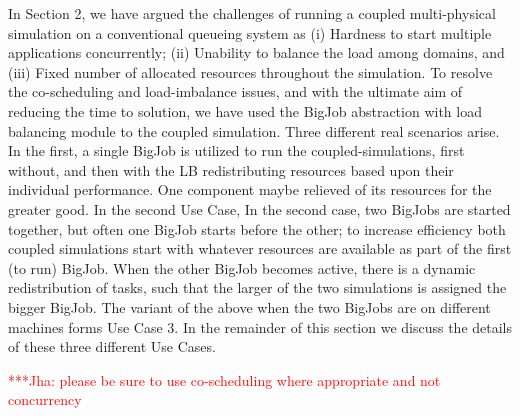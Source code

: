 \documentclass[conference,final]{IEEEtran}
\newcommand{\jhanote}[1]{ {\textcolor{red} { ***Jha: #1 }}}
\newcommand{\jhanote}[1]{}
\begin{document}
In Section 2, we have argued the challenges of running a coupled multi-physical simulation on a conventional queueing system as (i) Hardness to start multiple applications concurrently; (ii) Unability to balance the load among domains, and (iii) Fixed number of allocated resources throughout the simulation.  To resolve the co-scheduling and load-imbalance issues, and with the ultimate aim of reducing the time to solution, we have used the BigJob abstraction with load balancing module to the coupled simulation. %
Three different real scenarios arise. In the first, a single BigJob is utilized to run the coupled-simulations, first without, and then with the LB redistributing resources based upon their individual performance. One component maybe relieved of its resources for the greater good. In the second Use Case, In the second case, two BigJobs are started together, but often one BigJob starts before the other; to increase efficiency both coupled simulations start with whatever resources are available as part of the first (to run) BigJob. When the other BigJob becomes active, there is a dynamic redistribution of tasks, such that
the larger of the two simulations is assigned the bigger BigJob. The variant of the above when 
the two BigJobs are on different machines forms Use Case 3. In the remainder of this section we discuss
the details of these three different Use Cases.


\jhanote{please be sure to use co-scheduling where appropriate and not concurrency}
\end{document}
